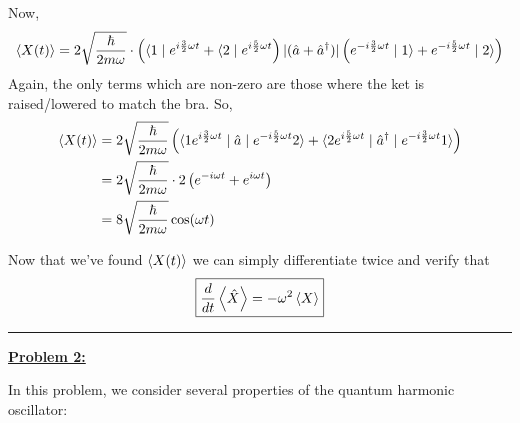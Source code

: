 \documentclass[twoside]{article}
\begin{document}
\begin{enumerate}
   Now, 
   \begin{align*}
      \left\langle X(t) \right\rangle &= 2\sqrt{\frac{\hbar}{2m\omega}} \cdot \left( \langle1\mid e^{i\frac{3}{2}\omega t} + \langle2\mid e^{i\frac{5}{2}\omega t}\right)|(\hat{a} + \hat{a}^{\dagger})|\left( e^{-i\frac{3}{2}\omega t} \mid1\rangle + e^{-i\frac{5}{2}\omega t} \mid2\rangle \right) \\
   \end{align*}
   Again, the only terms which are non-zero are those where the ket is raised/lowered to match the bra. So,
   \begin{align*}
      \left\langle X(t) \right\rangle &= 2\sqrt{\frac{\hbar}{2m\omega}} \left( \langle1 e^{i\frac{3}{2}\omega t}\mid \hat{a}\mid e^{-i\frac{5}{2}\omega t} 2\rangle + \langle2 e^{i\frac{5}{2}\omega t}\mid\hat{a}^{\dagger}\mid e^{-i\frac{3}{2}\omega t} 1\rangle \right) \\
      &= 2\sqrt{\frac{\hbar}{2m\omega}} \cdot 2 \left( e^{-i\omega t} + e^{ i \omega t} \right) \\
      &= 8\sqrt{\frac{\hbar}{2m\omega}} \cos(\omega t)
   \end{align*}

   Now that we've found $\left\langle X(t) \right\rangle$ we can simply differentiate twice and verify that 
   \[ \boxed{\frac{d}{dt}\left\langle \hat{X} \right\rangle = -\omega^2 \left\langle X \right\rangle} \] 
\end{enumerate}

\vskip 0.5cm
\hrule
\vskip 0.5cm


\underline{\textbf{Problem 2:}}

In this problem, we consider several properties of the quantum harmonic oscillator:
\end{document}
